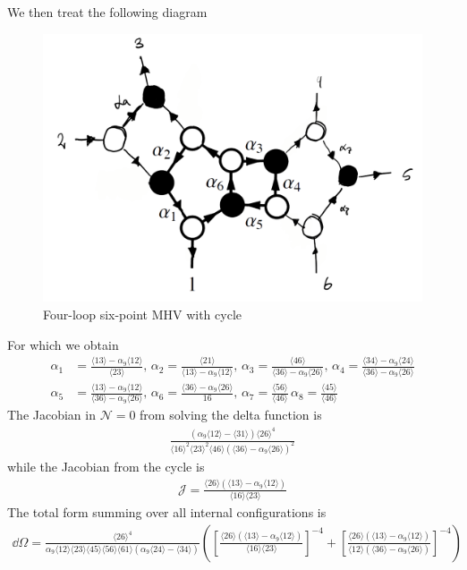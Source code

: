 \documentclass[letter,11pt]{article}
\newcommand{\ab}[1]{\langle #1 \rangle}
\begin{document}
We then treat the following diagram
\begin{figure}[H]
	\centering
	\includegraphics[width=0.4\linewidth]{6pt4l_2}
	\caption{Four-loop six-point MHV with cycle}
	\label{fig:two-loop}
\end{figure}
\noindent
For which we obtain
\begin{equation}
	\begin{aligned}
		\alpha_1&=\frac{\ab{13}-\alpha_9\ab{12}}{\ab{23}},\,\alpha_2=\frac{\ab{21}}{\ab{13}-\alpha_9\ab{12}},\,\alpha_3=\frac{\ab{46}}{\ab{36}-\alpha_9\ab{26}},\,\alpha_4=\frac{\ab{34}-\alpha_9\ab{24}}{\ab{36}-\alpha_9\ab{26}}\\
		\alpha_5&=\frac{\ab{13}-\alpha_9\ab{12}}{\ab{36}-\alpha_9\ab{26}},\,\alpha_6=\frac{\ab{36}-\alpha_9\ab{26}}{16},\,\alpha_7=\frac{\ab{56}}{\ab{46}}\,\alpha_8=\frac{\ab{45}}{\ab{46}}
	\end{aligned}
\end{equation}
The Jacobian in $\mathcal{N}=0$ from solving the delta function is 
\begin{equation}
	\begin{aligned}
		\frac{\left(\alpha_9\ab{12}-\ab{31}\right)\ab{26}^4}{\ab{16}^2\ab{23}^2\ab{46}\left(\ab{36}-\alpha_9 \ab{26}\right)^2}
	\end{aligned}
\end{equation}
while the Jacobian from the cycle is
\begin{equation}
	\begin{aligned}
		\mathcal{J}=\frac{\ab{26}\left(\ab{13}-\alpha_9\ab{12}\right)}{\ab{16}\ab{23}}
	\end{aligned}
\end{equation}
The total form summing over all internal configurations is
\begin{equation}
	\begin{aligned}
		\dd\Omega =\frac{\ab{26}^4}{\alpha_9 \ab{12}\ab{23}\ab{45}\ab{56}\ab{61}\left(\alpha_9\ab{24}-\ab{34}\right)}\left(	\left[\frac{\ab{26}\left(\ab{13}-\alpha_9\ab{12}\right)}{\ab{16}\ab{23}}\right]^{-4}+
		\left[\frac{\ab{26}\left(\ab{13}-\alpha_9\ab{12}\right)}{\ab{12}\left(\ab{36}-\alpha_9\ab{26}\right)}\right]^{-4}\right)
	\end{aligned}
\end{equation}
\end{document}
